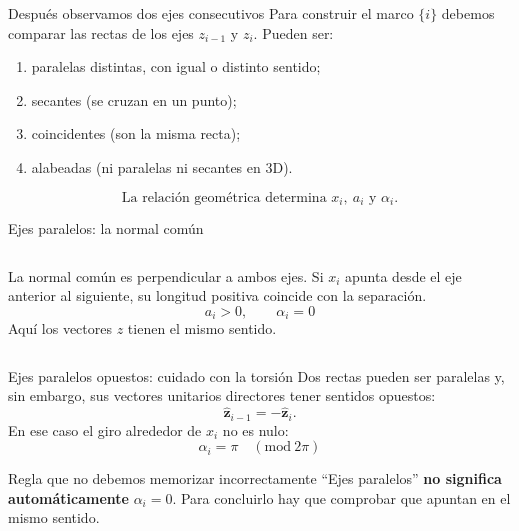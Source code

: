 \documentclass[aspectratio=169,11pt]{beamer}
\begin{document}
\begin{frame}[t]{Después observamos dos ejes consecutivos}
 \small
 Para construir el marco $\{i\}$ debemos comparar las rectas
 de los ejes $z_{i-1}$ y $z_i$. Pueden ser:
 \begin{enumerate}
  \item paralelas distintas, con igual o distinto sentido;
  \item secantes (se cruzan en un punto);
  \item coincidentes (son la misma recta);
  \item alabeadas (ni paralelas ni secantes en 3D).
 \end{enumerate}
 \pause
 \[
 \boxed{\text{La relación geométrica determina }x_i,
 \ a_i\text{ y }\alpha_i.}
 \]
\end{frame}

\begin{frame}[t]{Ejes paralelos: la normal común}
 \begin{columns}[T,onlytextwidth]
 \centering
 \small La normal común es perpendicular a ambos ejes.
 Si $x_i$ apunta desde el eje anterior al siguiente,
 su longitud positiva coincide con la separación.
 \pause
 \[\boxed{a_i>0,\qquad\alpha_i=0} \]
 \small Aquí los vectores $z$ tienen el mismo sentido.
 \end{columns}
\end{frame}

\begin{frame}[t]{Ejes paralelos opuestos: cuidado con la torsión}
 \small
 Dos rectas pueden ser paralelas y, sin embargo, sus vectores
 unitarios directores tener sentidos opuestos:
 \[
 \hat{\mathbf z}_{i-1}=-\hat{\mathbf z}_i.
 \]
 \pause
 En ese caso el giro alrededor de $x_i$ no es nulo:
 \[
 \boxed{\alpha_i=\pi\quad(\mathrm{mod}\ 2\pi)}
 \]
 \pause
 \begin{alertblock}{Regla que no debemos memorizar incorrectamente}
 ``Ejes paralelos'' \textbf{no significa automáticamente} $\alpha_i=0$.
 Para concluirlo hay que comprobar que apuntan en el mismo sentido.
 \end{alertblock}
\end{frame}
\end{document}
